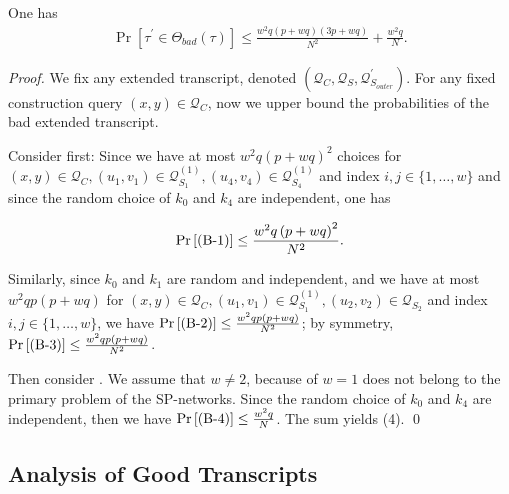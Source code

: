 \begin{lemma}
	\label{lemma:bad-tau-4-rounds}
	
	One has
	\begin{align}
	\operatorname{Pr}[\tau^{\prime} \in \Theta_{bad}(\tau)] \leq \frac{w^2 q (p+w q) (3 p +w q)}{N^{2}} + \frac{w^{2} q}{N}.
	\label{eq:bound-bad-tau-4-rounds}
	\end{align}
\end{lemma}
\begin{proof}
We fix any extended transcript, denoted $\left(\mathcal{Q}_{C}, \mathcal{Q}_{S}, \mathcal{Q}_{S_{outer}}^{\prime}\right)$. For any fixed construction query $(x, y) \in \mathcal{Q}_{C}$, now we upper bound the probabilities of the bad extended transcript.

Consider \bone first: Since we have at most $w^{2} q \left(p+w q\right)^{2}$ choices for $(x, y) \in \mathcal{Q}_{C}, \left(u_{1}, v_{1}\right) \in \mathcal{Q}_{S_{1}}^{(1)}, \left(u_{4}, v_{4}\right) \in \mathcal{Q}_{S_{4}}^{(1)}$ and index $i, j \in \{1, \ldots, w\}$ and since the random choice of $k_{0}$ and $k_{4}$ are independent, one has

$$
\operatorname{Pr}\left[\text{(B-1)}\right] \leq \frac{w^{2} q \left(p+w q\right)^{2}}{N^{2}}.
$$

Similarly, since $k_{0}$ and $k_{1}$ are random and independent, and we have at most $w^{2} q p \left(p+w q\right)$ for $(x, y) \in \mathcal{Q}_{C}, \left(u_{1}, v_{1}\right) \in \mathcal{Q}_{S_{1}}^{(1)}, \left(u_{2}, v_{2}\right) \in \mathcal{Q}_{S_{2}}$ and index $i, j \in \{1, \ldots, w\}$, we have $\operatorname{Pr}\left[\text{(B-2)}\right] \leq \frac{w^{2} q p \left(p+w q\right)}{N^{2}}$; by symmetry, $\operatorname{Pr}\left[\text{(B-3)}\right] \leq \frac{w^{2} q p \left(p+w q\right)}{N^{2}}$.

Then consider \bfour. We assume that $w \neq 2$, because of $w = 1$ does not belong to the primary problem of the SP-networks. Since the random choice of $k_{0}$ and $k_{4}$ are independent, then we have $\operatorname{Pr}\left[\text{(B-4)}\right] \leq \frac{w^{2} q}{N}$. The sum yields (4).   	\qed
\end{proof}






\subsection{Analysis of Good Transcripts}


